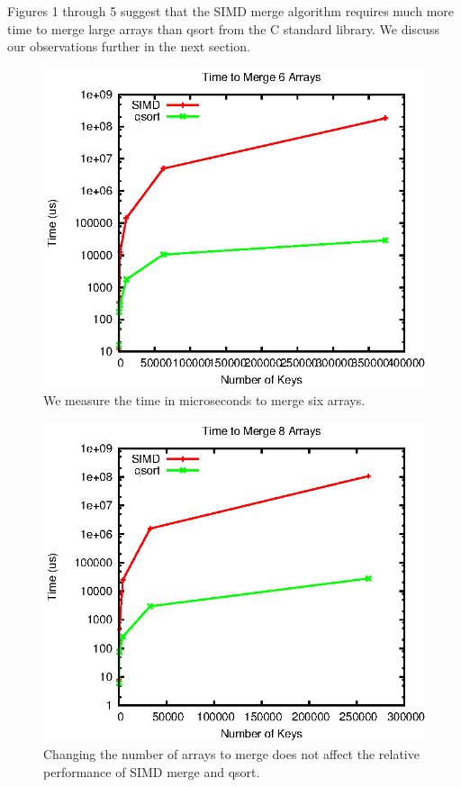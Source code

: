 \documentclass[10pt,twocolumn]{article}
\begin{document}
Figures 1 through 5 suggest that the SIMD merge algorithm requires much more time to merge large arrays than qsort from the C standard library.  We discuss our observations further in the next section.

\begin{figure}
\label{f6}
\includegraphics[width=\linewidth]{6.eps}
\caption{We measure the time in microseconds to merge six arrays.}
\end{figure}

\begin{figure}
\label{f8}
\includegraphics[width=\linewidth]{8.eps}
\caption{Changing the number of arrays to merge does not affect the relative performance of SIMD merge and qsort.}
\end{figure}
\end{document}
